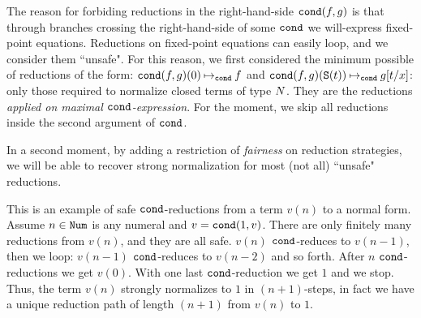 The reason for forbiding
reductions in the right-hand-side ${\tt cond}(f,g)$ is that through branches crossing the right-hand-side
of some ${\tt cond}$ we will-express fixed-point equations.
Reductions on fixed-point equations can easily loop, and we consider them ``unsafe". 
For this reason, we first considered the minimum possible of reductions of the form:
${\tt cond}(f,g)(0) \mathbin{\mapsto}_{\tt cond} f$ and
${\tt cond}(f,g)({\tt S} (t)) \mathbin{\mapsto}_{\tt cond} g[t/x]$: only  those required to normalize closed
terms of type ${N}$. They are the reductions \emph{applied on maximal ${\tt cond}$-expression}.
For the moment, we skip all reductions inside the second argument of ${\tt cond}$.

In a second moment, 
by adding a restriction of \emph{fairness} on reduction strategies,
we will be able to recover strong normalization for most (not all) ``unsafe" reductions.

\begin{Eg}
This is an example of safe ${\tt cond}$-reductions from a term $v(n)$ to a normal form. 
Assume $n \in {\tt Num}$ is any numeral and $v = {\tt cond}(1, v)$. There are only finitely many reductions
from $v(n)$, and they are all safe. $v(n)$ ${\tt cond}$-reduces to $v(n-1)$, 
then we loop: $v(n-1)$ ${\tt cond}$-reduces to $v(n-2)$ and so forth.
After $n$ ${\tt cond}$-reductions we get $v(0)$. With one last ${\tt cond}$-reduction we get $1$ and we stop. 
Thus, the term $v(n)$ strongly normalizes to $1$ in $(n+1)$-steps, in fact we have a unique reduction path of
length $(n+1)$ from $v(n)$ to $1$.
\end{Eg}
